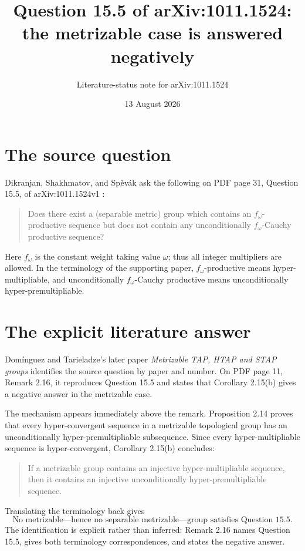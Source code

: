 \documentclass[11pt]{article}
\title{Question 15.5 of arXiv:1011.1524:\\
the metrizable case is answered negatively}
\author{Literature-status note for arXiv:1011.1524}
\date{13 August 2026}
\begin{document}
\maketitle

\begin{center}
\end{center}

\section{The source question}

Dikranjan, Shakhmatov, and Sp\v{e}v\'ak ask the following on PDF page 31,
Question 15.5, of arXiv:1011.1524v1 \cite{DSS}:
\begin{quote}
Does there exist a (separable metric) group which contains an
$f_\omega$-productive sequence but does not contain any unconditionally
$f_\omega$-Cauchy productive sequence?
\end{quote}
Here $f_\omega$ is the constant weight taking value $\omega$; thus all integer
multipliers are allowed.  In the terminology of the supporting paper,
$f_\omega$-productive means hyper-multipliable, and unconditionally
$f_\omega$-Cauchy productive means unconditionally hyper-premultipliable.

\section{The explicit literature answer}

Dom\'inguez and Tarieladze's later paper
\emph{Metrizable TAP, HTAP and STAP groups} \cite{DT} identifies the source
question by paper and number.  On PDF page 11, Remark 2.16, it reproduces
Question 15.5 and states that Corollary 2.15(b) gives a negative answer in the
metrizable case.

The mechanism appears immediately above the remark.  Proposition 2.14 proves
that every hyper-convergent sequence in a metrizable topological group has an
unconditionally hyper-premultipliable subsequence.  Since every
hyper-multipliable sequence is hyper-convergent, Corollary 2.15(b) concludes:
\begin{quote}
If a metrizable group contains an injective hyper-multipliable sequence, then
it contains an injective unconditionally hyper-premultipliable sequence.
\end{quote}
Translating the terminology back gives
\[
 \boxed{\text{No metrizable---hence no separable metrizable---group satisfies
 Question 15.5.}}
\]
The identification is explicit rather than inferred: Remark 2.16 names
Question 15.5, gives both terminology correspondences, and states the negative
answer.
\end{document}
